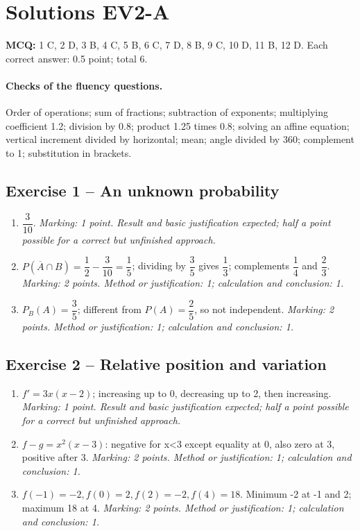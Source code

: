 \mxnewpage\section*{Solutions EV2-A}\label{EV2-A-CORR}
\textbf{MCQ:} 1 C, 2 D, 3 B, 4 C, 5 B, 6 C, 7 D, 8 B, 9 C, 10 D, 11 B, 12 D. Each correct answer: \num{0,5} point; total 6.
\paragraph{Checks of the fluency questions.} Order of operations; sum of fractions; subtraction of exponents; multiplying coefficient \num{1,2}; division by \num{0,8}; product \num{1,25} times \num{0,8}; solving an affine equation; vertical increment divided by horizontal; mean; angle divided by 360; complement to 1; substitution in brackets.
\subsection*{Exercise 1 -- An unknown probability}
\begin{enumerate}
\item $\dfrac{3}{10}$. \textit{Marking: 1 point. Result and basic justification expected; half a point possible for a correct but unfinished approach.}
\item $P(\overline A\cap B)=\dfrac{1}{2}-\dfrac{3}{10}=\dfrac{1}{5}$; dividing by $\dfrac{3}{5}$ gives $\dfrac{1}{3}$; complements $\dfrac{1}{4}$ and $\dfrac{2}{3}$. \textit{Marking: 2 points. Method or justification: 1; calculation and conclusion: 1.}
\item $P_B(A)=\dfrac{3}{5}$; different from $P(A)=\dfrac{2}{5}$, so not independent. \textit{Marking: 2 points. Method or justification: 1; calculation and conclusion: 1.}
\end{enumerate}
\subsection*{Exercise 2 -- Relative position and variation}
\begin{enumerate}
\item $f\prime=3x(x-2)$; increasing up to 0, decreasing up to 2, then increasing. \textit{Marking: 1 point. Result and basic justification expected; half a point possible for a correct but unfinished approach.}
\item $f-g=x^2(x-3)$: negative for x<3 except equality at 0, also zero at 3, positive after 3. \textit{Marking: 2 points. Method or justification: 1; calculation and conclusion: 1.}
\item $f(-1)=-2,f(0)=2,f(2)=-2,f(4)=18$. Minimum -2 at -1 and 2; maximum 18 at 4. \textit{Marking: 2 points. Method or justification: 1; calculation and conclusion: 1.}
\end{enumerate}

